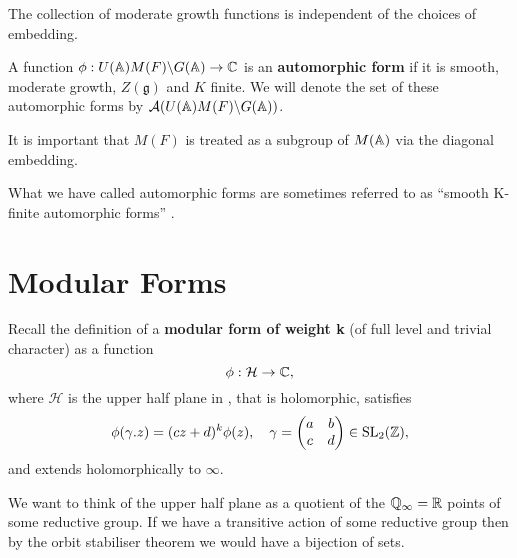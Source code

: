     \begin{remark}
        The collection of moderate growth functions is independent of the choices of embedding. 
    \end{remark}

\begin{definition}
    A function \(\phi: U(\A)M(F)\backslash G(\A) \to \C\) is an \textbf{automorphic form} if it is smooth, moderate growth, \(Z(\mathfrak{g})\) and \(K\) finite. We will denote the set of these automorphic forms by \(\mathcal{A}(U(\A)M(F)\backslash G(\A))\).
\end{definition}

\begin{remark}
    It is important that \(M(F)\) is treated as a subgroup of \(M(\A)\) via the diagonal embedding.
\end{remark}
\begin{remark}
	What we have called automorphic forms are sometimes referred to as ``smooth K-finite automorphic forms'' \cite[2.2]{cogdellLecturesLfunctionsConverse}.
\end{remark}
	
    

\section{Modular Forms} \label{sec:modular-forms}

	Recall the definition of a \textbf{modular form of weight k} (of full level and trivial character) \cite[1.1.2]{diamondFirstCourseModular2005} as a function
		\[\phi: \mathcal{H} \to \C,\]
		where \(\mathcal{H}\) is the upper half plane in \C, that is holomorphic, satisfies 
		\[\phi(\gamma.z) = (cz+d)^k\phi(z), \quad \gamma = \begin{pmatrix}
			a &b \\
			c &d
		\end{pmatrix}\in \SL_2(\Z),\]
		and extends holomorphically to \(\infty\).

	We want to think of the upper half plane as a quotient of the \(\Q_\infty = \R\) points of some reductive group. If we have a transitive action of some reductive group then by the orbit stabiliser theorem we would have a bijection of sets.

